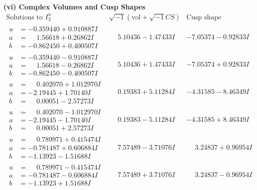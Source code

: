\documentclass[1p]{elsarticle_modified}
\theoremstyle{definition}
\newcommand{\I}{\sqrt{-1}}
\begin{document}
\newpage\flushleft \textbf{(vi) Complex Volumes and Cusp Shapes}
$$\begin{array}{c|c|c}  
\text{Solutions to }I^u_{3}& \I (\text{vol} + \sqrt{-1}CS) & \text{Cusp shape}\\
 \hline 
\begin{aligned}
u &= -0.359440 + 0.910887 I \\
a &= \phantom{-}1.56618 + 0.26862 I \\
b &= -0.862450 + 0.400507 I\end{aligned}
 & \phantom{-}5.10436 - 1.47433 I & -7.05374 - 0.92833 I \\ \hline\begin{aligned}
u &= -0.359440 - 0.910887 I \\
a &= \phantom{-}1.56618 - 0.26862 I \\
b &= -0.862450 - 0.400507 I\end{aligned}
 & \phantom{-}5.10436 + 1.47433 I & -7.05374 + 0.92833 I \\ \hline\begin{aligned}
u &= \phantom{-}0.402070 + 1.012970 I \\
a &= -2.19445 + 1.70140 I \\
b &= \phantom{-}0.00051 - 2.57273 I\end{aligned}
 & \phantom{-}0.19383 + 5.11284 I & -4.31585 - 8.46349 I \\ \hline\begin{aligned}
u &= \phantom{-}0.402070 - 1.012970 I \\
a &= -2.19445 - 1.70140 I \\
b &= \phantom{-}0.00051 + 2.57273 I\end{aligned}
 & \phantom{-}0.19383 - 5.11284 I & -4.31585 + 8.46349 I \\ \hline\begin{aligned}
u &= \phantom{-}0.789971 + 0.415474 I \\
a &= -0.781487 + 0.606884 I \\
b &= -1.13923 - 1.51688 I\end{aligned}
 & \phantom{-}7.57489 - 3.71076 I & \phantom{-}3.24837 + 0.96954 I \\ \hline\begin{aligned}
u &= \phantom{-}0.789971 - 0.415474 I \\
a &= -0.781487 - 0.606884 I \\
b &= -1.13923 + 1.51688 I\end{aligned}
 & \phantom{-}7.57489 + 3.71076 I & \phantom{-}3.24837 - 0.96954 I \\ \hline\begin{aligned}

\end{aligned}
\end{array}$$
\end{document}
